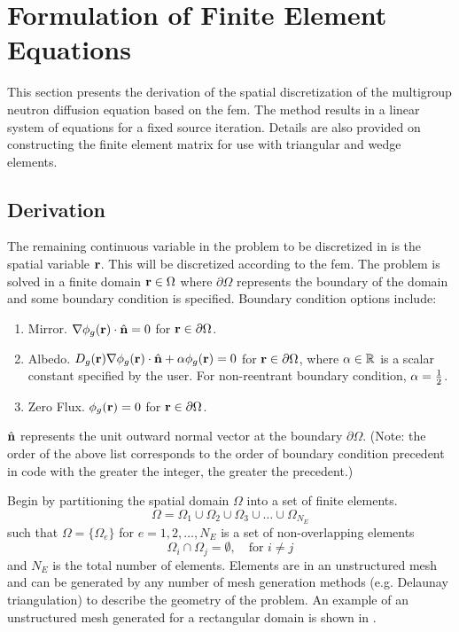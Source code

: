 \section{Formulation of Finite Element Equations}
  \label{sec:formulation}
  This section presents the derivation of the spatial discretization of the
  multigroup neutron diffusion equation based on the \gls{fem}. The method
  results in a linear system of equations for a fixed source iteration. Details
  are also provided on constructing the finite element matrix for use with
  triangular and wedge elements.

  \subsection{Derivation}
    \label{sec:formulation:derivation}
    The remaining continuous variable in the problem to be discretized in
     is the spatial variable $\mathbf{r}$. This will be 
    discretized according to the \gls{fem}. The problem is solved in a finite 
    domain $\mathbf{r} \in \Omega$ where $\partial \Omega$ represents the boundary of 
    the domain and some boundary condition is specified. Boundary condition 
    options include:
    \begin{enumerate}
      \item Mirror. $\mathbf{\nabla} \phi_g(\mathbf{r}) \cdot \hat{\mathbf{n}} = 0$ for 
        $\mathbf{r} \in \partial \Omega$.
      \item Albedo. $D_g(\mathbf{r}) \mathbf{\nabla} \phi_g(\mathbf{r}) \cdot \hat{\mathbf{n}} + 
        \alpha \phi_g(\mathbf{r})=0$ for $\mathbf{r} \in \partial \Omega$,
        where $\alpha \in \mathbb{R}$ is a scalar constant specified
        by the user. For non-reentrant boundary condition, $\alpha = \frac{1}{2}$.
      \item Zero Flux. $\phi_g(\mathbf{r}) = 0$ for $\mathbf{r} \in \partial \Omega$.
    \end{enumerate}
    $\hat{\mathbf{n}}$ represents the unit outward normal vector at the boundary $\partial
    \Omega$.
    (Note: the order of the above list corresponds to the order of boundary 
    condition precedent in code with the greater the integer, the greater the 
    precedent.)
    
    Begin by partitioning the spatial domain $\Omega$ into a set of finite 
    elements.
    \begin{equation}
      \label{eq:set_of_elements}
      \Omega = \Omega_1 \cup \Omega_2 \cup \Omega_3 \cup \ldots \cup
        \Omega_{N_E} 
    \end{equation}
    such that $\Omega = \{\Omega_e\}$ for $e = 1,2,\ldots,N_E$ is a set of
    non-overlapping elements 
    \begin{equation}
      \label{eq:non_overlapping}
      \Omega_i \cap \Omega_j = \emptyset, \quad \text{for } i \ne j
    \end{equation}
    and $N_E$ is the total number of elements. Elements are in an unstructured
    mesh and can be generated by any number of mesh generation methods (e.g.
    Delaunay triangulation) to describe the geometry of the problem. An example
    of an unstructured mesh generated for a rectangular domain is shown in
    .

